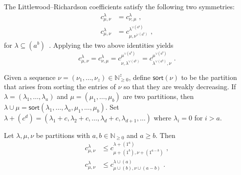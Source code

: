 \documentclass[ALCO,ThmDefs,Unicode,epreuves]{cedram}
\newcommand{\sort}{\mathsf{sort}}
\begin{document}
The Littlewood--Richardson coefficients satisfy the following two symmetries:
\begin{align}
\label{eq:LRsymmetrybasic}
c_{\mu, \nu}^{\lambda} &= c_{\nu, \mu}^{\lambda}\,\, ,
\\ 
\label{eq:LRsymmetry-transpose}
c_{\mu, \nu}^{\lambda} &= c_{\mu, \nu^{\vee(a^b)}}^{\lambda^{\vee(a^b)}}\,\, ,
\end{align}
for $\lambda \subseteq (a^b)$~\cite{S99}. Applying the two above identities yields
\begin{equation}
\label{eq:LRsymmetry-rotate}
c^\lambda_{\mu,\nu} = c^\lambda_{\nu,\mu} = c^{\mu^{\vee(a^b)}}_{\nu, \lambda^{\vee(a^b)}} = c^{\mu^{\vee(a^b)}}_{\lambda^{\vee(a^b)}, \nu}\, \,.
\end{equation}

Given a sequence $\nu = (\nu_1,\ldots,\nu_z)\in \mathbb{N}_{\geq 0}^z$, define $\sort(\nu)$ to be the partition that arises from sorting the entries of $\nu$ so that they are weakly decreasing. If $\lambda = (\lambda_1,\ldots,\lambda_a)$ and $\mu = (\mu_1,\ldots,\mu_b)$ are two partitions, then $\lambda \cup \mu = \sort (\lambda_1,\ldots,\lambda_a,\mu_1,\ldots,\mu_b)$. Set $\lambda + (c^d) = (\lambda_1 + c, \lambda_2 + c,\ldots,\lambda_d + c, \lambda_{d+1}, \ldots)$ where $\lambda_i = 0$ for $i > a$.

\begin{theorem}[{\cite[Theorem 3.1]{G10}}] \label{theorem:gutReduction} Let $\lambda, \mu, \nu$ be partitions with $a,b \in \mathbb{N}_{\geq 0}$ and $a \geq b$. Then 
\begin{align}
\label{eq:LRsymmetryswap}
c_{\mu,\nu}^{\lambda} &\leq c_{\mu + (1^b),\nu + (1^{a-b})}^{\lambda + (1^a)}\, \, ,
\\
c_{\mu,\nu}^{\lambda} &\leq c_{\mu \cup (b),\nu \cup (a-b)}^{\lambda \cup (a)}\, \,.
\end{align}

\end{theorem}
\end{document}
